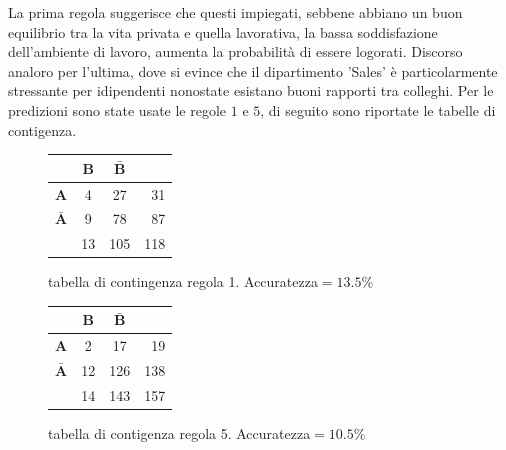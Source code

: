 \documentclass[a4paper,9pt]{article}
\begin{document}
La prima regola suggerisce che questi impiegati, sebbene abbiano un buon equilibrio tra la vita privata e quella lavorativa, la bassa soddisfazione dell'ambiente di lavoro, aumenta la probabilità di essere logorati. Discorso analoro per l'ultima, dove si evince che il dipartimento 'Sales' è particolarmente stressante per idipendenti nonostate esistano buoni rapporti tra colleghi.
Per le predizioni sono state usate le regole $1$ e $5$, di seguito sono riportate le tabelle di contigenza.

\begin{figure}[H]
  \centering
  \begin{minipage}{.45\textwidth}
    \centering
    \begin{tabular}{l|cc|r}
& \bfseries B & $\bar{\textbf {B}}$ &\\
\hline
\bfseries A & 4 & 27 &31\\
 $\bar{\textbf {A}}$ & 9&78&87\\
\hline
& 13&105&118\\
\end{tabular}
    \caption{tabella di contingenza regola 1. Accuratezza$=13.5\%$}
  \end{minipage}
  \begin{minipage}{.45\textwidth}
    \centering
    \begin{tabular}{l|cc|r}
& \bfseries B &  $\bar{\textbf {B}}$ &\\
\hline
\bfseries A & 2& 17 &19\\
 $\bar{\textbf {A}}$ & 12&126&138\\
\hline
& 14&143&157\\
\end{tabular}
    \caption{tabella di contigenza regola 5.  Accuratezza$=10.5\%$}
  \end{minipage}
  \end{figure}

	
\end{document}
